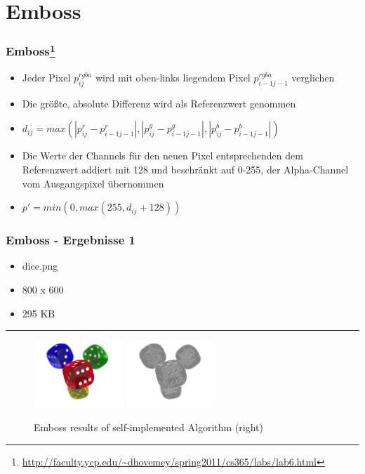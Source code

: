 \section{Emboss}

\begin{frame}
    \frametitle{Emboss\footnote{\url{http://faculty.ycp.edu/~dhovemey/spring2011/cs365/labs/lab6.html}}}

    \begin{itemize}
        \item Jeder Pixel $ p^{rgba}_{ij} $ wird mit oben-links liegendem Pixel $ p^{rgba}_{i-1j-1} $ verglichen \pause
        \item Die größte, absolute Differenz wird als Referenzwert genommen
        \item $ d_{ij} = max(|p^{r}_{ij} - p^{r}_{i-1j-1}|, |p^{g}_{ij} - p^{g}_{i-1j-1}|, |p^{b}_{ij} - p^{b}_{i-1j-1}|) $ \pause
        \item Die Werte der Channels für den neuen Pixel entsprechenden dem Referenzwert addiert mit 128 und beschränkt auf 0-255, der Alpha-Channel vom Ausgangspixel übernommen \pause
        \item $ p' = min(0, max(255, d_{ij} + 128)) $
    \end{itemize}
\end{frame}

\begin{frame}
    \frametitle{Emboss - Ergebnisse 1}

    \begin{itemize}
        \item dice.png
        \item 800 x 600
        \item 295 KB
    \end{itemize}

    \hfill
    \hrule
    \hfill

    \begin{figure}[H]
        \centering
    
        \includegraphics[width=0.30\textwidth]{images/dice.png}
        \includegraphics[width=0.30\textwidth]{images/results/emboss-my.dice.png}

        
        \begin{center}
            \caption{Emboss results of self-implemented Algorithm (right)}
        \end{center}

        \label{fig:emboss1}
    \end{figure}
\end{frame}

